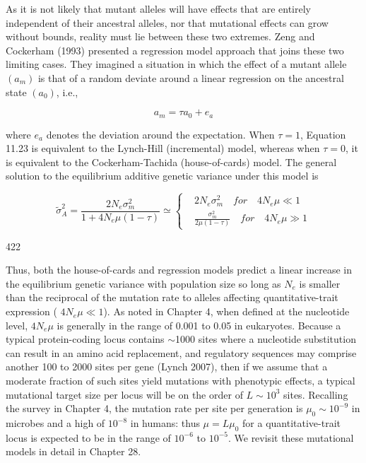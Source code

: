 \documentclass{article}
\begin{document}
As it is not likely that mutant alleles will have effects that are entirely independent of their ancestral alleles, nor that mutational effects can grow without bounds, reality must lie between these two extremes. Zeng and Cockerham (1993) presented a regression model approach that joins these two limiting cases. They imagined a situation in which the effect of a mutant allele  $ (a_{m}) $ is that of a random deviate around a linear regression on the ancestral state  $ (a_{0}) $, i.e.,

\begin{equation}
a_{m}=\tau a_{0}+e_{a}
\tag{11.23}
\label{eq:11_23}
\end{equation}

where  $ e_{a} $ denotes the deviation around the expectation. When  $ \tau = 1 $, Equation 11.23 is equivalent to the Lynch-Hill (incremental) model, whereas when  $ \tau = 0 $, it is equivalent to the Cockerham-Tachida (house-of-cards) model. The general solution to the equilibrium additive genetic variance under this model is

\begin{equation}
\widetilde{\sigma}_{A}^{2}=\frac{2N_{e}\sigma_{m}^{2}}{1+4N_{e}\mu(1-\tau)}\simeq\left\{\begin{aligned}&2N_{e}\sigma_{m}^{2}\quad for\quad4N_{e}\mu\ll1\\ &\frac{\sigma_{m}^{2}}{2\mu(1-\tau)}\quad for\quad4N_{e}\mu\gg1\end{aligned}\right.
\tag{11.24}
\label{eq:11_24}
\end{equation}

422

Thus, both the house-of-cards and regression models predict a linear increase in the equilibrium genetic variance with population size so long as  $ N_e $ is smaller than the reciprocal of the mutation rate to alleles affecting quantitative-trait expression ( $ 4N_e\mu \ll 1 $). As noted in Chapter 4, when defined at the nucleotide level,  $ 4N_e\mu $ is generally in the range of 0.001 to 0.05 in eukaryotes. Because a typical protein-coding locus contains  $ \sim $1000 sites where a nucleotide substitution can result in an amino acid replacement, and regulatory sequences may comprise another 100 to 2000 sites per gene (Lynch 2007), then if we assume that a moderate fraction of such sites yield mutations with phenotypic effects, a typical mutational target size per locus will be on the order of  $ L \sim 10^3 $ sites. Recalling the survey in Chapter 4, the mutation rate per site per generation is  $ \mu_0 \sim 10^{-9} $ in microbes and a high of  $ 10^{-8} $ in humans: thus  $ \mu = L\mu_0 $ for a quantitative-trait locus is expected to be in the range of  $ 10^{-6} $ to  $ 10^{-5} $. We revisit these mutational models in detail in Chapter 28.
\end{document}
